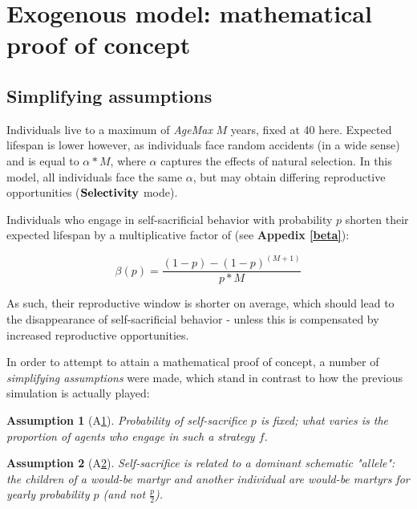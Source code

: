 \documentclass[a4paper,12pt]{report}
\newtheorem{ass}{Assumption}[section]
\begin{document}


\section{Exogenous model: mathematical proof of concept}
\label{sec_exo_math}



\subsection{Simplifying assumptions}
\label{ss:exm_eq}
Individuals live to a maximum of \emph{AgeMax} $M$ years, fixed at 40 here. 
 Expected lifespan is lower however, as individuals face random accidents
 (in a wide sense) and is equal to $\alpha*M$, where $\alpha$ captures
 the effects of natural selection. In this model, all individuals face the same $\alpha$, but
 may obtain differing reproductive opportunities ($\bf{Selectivity}$ mode).

Individuals who engage in self-sacrificial behavior with probability $p$
 shorten their expected lifespan by a multiplicative factor of (see \textbf{Appedix \ref{beta}}):
 
\begin{equation}
 \beta(p) = \frac{(1-p) - (1-p)^{(M+1)}}{p*M} 
\label{eq_beta}
\end{equation}

As such, their reproductive window is shorter on average, which should lead to the disappearance of
self-sacrificial behavior - unless this is compensated by increased reproductive opportunities. 
 
In order to attempt to attain a mathematical proof of concept, a number of \emph{simplifying assumptions}
were made, which stand in contrast to how the previous simulation is actually played:

\begin{ass}[A\ref{ass:p_fixed}] \label{ass:p_fixed}
    Probability of self-sacrifice $p$ is fixed; 
    what varies is the proportion of agents who engage
    in such a strategy $f$.
    \end{ass}

\begin{ass}[A\ref{ass:domi}] \label{ass:domi}
    Self-sacrifice is related to a dominant schematic "allele": the children
    of a would-be martyr and another individual are would-be
    martyrs for yearly probability $p$
    (and not $\frac{p}{2}$).
    \end{ass}
\end{document}
